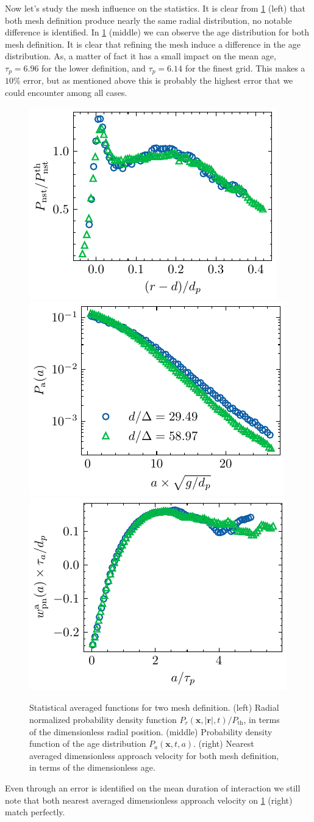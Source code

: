 Now let's study the mesh influence on the statistics. 
It is clear from \ref{fig:apstat} (left) that both mesh definition produce nearly the same radial distribution, no notable difference is identified. 
In \ref{fig:apstat} (middle) we can observe the age distribution for both mesh definition. 
It is clear that refining the mesh induce a difference in the age distribution. 
As, a matter of fact it has a small impact on the mean age, $\tau_p = 6.96$ for the lower definition, and $\tau_p = 6.14$ for the finest grid.
This makes a $10\%$ error, but as mentioned above this is probably the highest error that we could encounter among all cases. 
\begin{figure}
    \centering
    \includegraphics[height = 0.24\textwidth]{image/HOMOGENEOUS_NEW/VAL/Pr.pdf}
    \includegraphics[height = 0.24\textwidth]{image/HOMOGENEOUS_NEW/VAL/Pa.pdf}
    \includegraphics[height = 0.24\textwidth]{image/HOMOGENEOUS_NEW/VAL/w.pdf}
    \caption{
        Statistical averaged functions for two mesh definition. 
        (left) Radial normalized probability density function  $P_r(\textbf{x},|\textbf{r}|,t)/P_\text{th}$, in terms of the dimensionless radial position. 
        (middle) Probability density function of the age distribution $P_a(\textbf{x},t,a)$. 
        (right) Nearest averaged dimensionless approach velocity for both mesh definition, in terms of the dimensionless age. 
    }
    \label{fig:apstat}
\end{figure}
Even through an error is identified on the mean duration of interaction we still note that both nearest averaged dimensionless approach velocity on \ref{fig:apstat} (right) match perfectly. 
